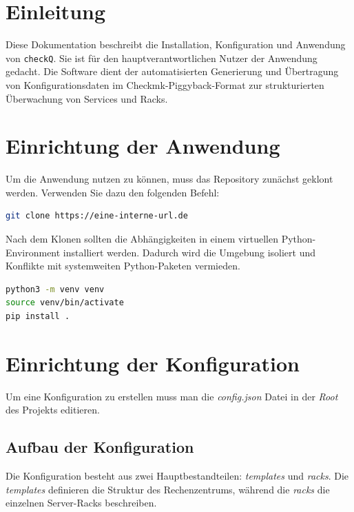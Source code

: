 \section{Einleitung}\label{sec:einleitung}
Diese Dokumentation beschreibt die Installation, Konfiguration und Anwendung von \texttt{checkQ}.
Sie ist für den hauptverantwortlichen Nutzer der Anwendung gedacht.
Die Software dient der automatisierten Generierung und Übertragung von Konfigurationsdaten im Checkmk-Piggyback-Format zur strukturierten Überwachung von Services und Racks.

\section{Einrichtung der Anwendung}\label{sec:einrichtung-der-anwendung}
Um die Anwendung nutzen zu können, muss das Repository zunächst geklont werden. Verwenden Sie dazu den folgenden Befehl:

\begin{lstlisting}[language=bash, caption=Klonen des Repositories, label=lst:git-clone]
git clone https://eine-interne-url.de
\end{lstlisting}

\noindent
Nach dem Klonen sollten die Abhängigkeiten in einem virtuellen Python-Environment installiert werden.
Dadurch wird die Umgebung isoliert und Konflikte mit systemweiten Python-Paketen vermieden.

\begin{lstlisting}[language=bash, caption=Erstellen und Aktivieren eines virtuellen Environments, label=lst:venv]
python3 -m venv venv
source venv/bin/activate
pip install .
\end{lstlisting}

\section{Einrichtung der Konfiguration}\label{sec:einrichtung-der-konfiguration}
Um eine Konfiguration zu erstellen muss man die \textit{config.json} Datei in der \textit{Root} des Projekts editieren.

\subsection{Aufbau der Konfiguration}\label{subsec:aufbau-der-konfiguration}
Die Konfiguration besteht aus zwei Hauptbestandteilen: \textit{templates} und \textit{racks}.
Die \textit{templates} definieren die Struktur des Rechenzentrums, während die \textit{racks} die einzelnen Server-Racks beschreiben.

